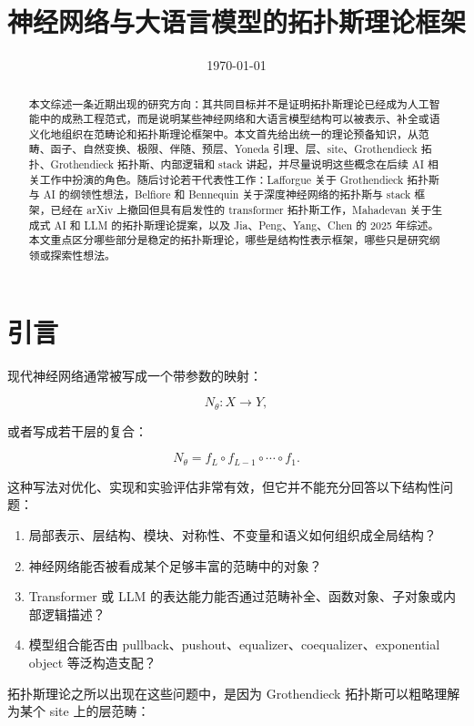 \documentclass[UTF8,11pt,fontset=none]{ctexart}
\title{神经网络与大语言模型的拓扑斯理论框架}
\author{}
\date{\today}
\begin{document}
\maketitle


\begin{abstract}
本文综述一条近期出现的研究方向：其共同目标并不是证明拓扑斯理论已经成为人工智能中的成熟工程范式，而是说明某些神经网络和大语言模型结构可以被表示、补全或语义化地组织在范畴论和拓扑斯理论框架中。本文首先给出统一的理论预备知识，从范畴、函子、自然变换、极限、伴随、预层、Yoneda 引理、层、site、Grothendieck 拓扑、Grothendieck 拓扑斯、内部逻辑和 stack 讲起，并尽量说明这些概念在后续 AI 相关工作中扮演的角色。随后讨论若干代表性工作：Lafforgue 关于 Grothendieck 拓扑斯与 AI 的纲领性想法，Belfiore 和 Bennequin 关于深度神经网络的拓扑斯与 stack 框架，已经在 arXiv 上撤回但具有启发性的 transformer 拓扑斯工作，Mahadevan 关于生成式 AI 和 LLM 的拓扑斯理论提案，以及 Jia、Peng、Yang、Chen 的 2025 年综述。本文重点区分哪些部分是稳定的拓扑斯理论，哪些是结构性表示框架，哪些只是研究纲领或探索性想法。


\end{abstract}

\section{引言}

现代神经网络通常被写成一个带参数的映射：


\[
N_\theta:X\longrightarrow Y,
\]

或者写成若干层的复合：


\[
N_\theta
=f_L\circ f_{L-1}\circ\cdots\circ f_1.
\]

这种写法对优化、实现和实验评估非常有效，但它并不能充分回答以下结构性问题：


\begin{enumerate}
\item 局部表示、层结构、模块、对称性、不变量和语义如何组织成全局结构？
\item 神经网络能否被看成某个足够丰富的范畴中的对象？
\item Transformer 或 LLM 的表达能力能否通过范畴补全、函数对象、子对象或内部逻辑描述？
\item 模型组合能否由 pullback、pushout、equalizer、coequalizer、exponential object 等泛构造支配？
\end{enumerate}

拓扑斯理论之所以出现在这些问题中，是因为 Grothendieck 拓扑斯可以粗略理解为某个 site 上的层范畴：
\end{document}
